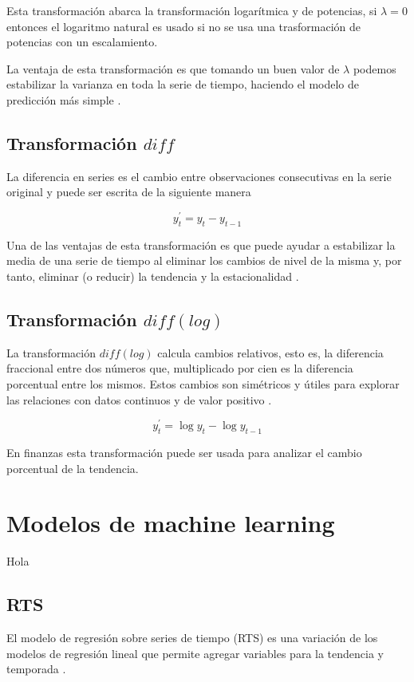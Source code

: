 Esta transformación abarca la transformación logarítmica y de potencias, si $\lambda = 0$ entonces el logaritmo natural es usado si no se usa una trasformación de potencias con un escalamiento.

La ventaja de esta transformación es que tomando un buen valor de $\lambda$ podemos estabilizar la varianza en toda la serie de tiempo, haciendo el modelo de predicción más simple \cite{hyndmanForecastingPrinciplesPractice}. 

\subsection{Transformación $diff$}

La diferencia en series es el cambio entre observaciones consecutivas en la serie original y puede ser escrita de la siguiente manera

\[
y_{t}^{\prime}=y_{t}-y_{t-1}
\]

Una de las ventajas de esta transformación es que puede ayudar a estabilizar la media de una serie de tiempo al eliminar los cambios de nivel de la misma y, por tanto, eliminar (o reducir) la tendencia y la estacionalidad \cite{hyndmanForecastingPrinciplesPractice}.

\subsection{Transformación $diff(log)$}

La transformación $diff(log)$ calcula cambios relativos, esto es, la diferencia fraccional entre dos números que, multiplicado por cien es la diferencia porcentual entre los mismos. Estos cambios son simétricos y útiles para explorar las relaciones con datos continuos y de valor positivo \cite{coleStatisticsNotesPercentage2017}.

\[
y_{t}^{\prime}=\log{y_{t}}-\log{y_{t-1}}
\]

En finanzas esta transformación puede ser usada para analizar el cambio porcentual de la tendencia.


\section{Modelos de machine learning}
Hola
\subsection{RTS}
El modelo de regresión sobre series de tiempo (RTS) es una variación de los modelos de regresión lineal que permite agregar variables para la tendencia y temporada \cite{TslmFitLinear}. 

